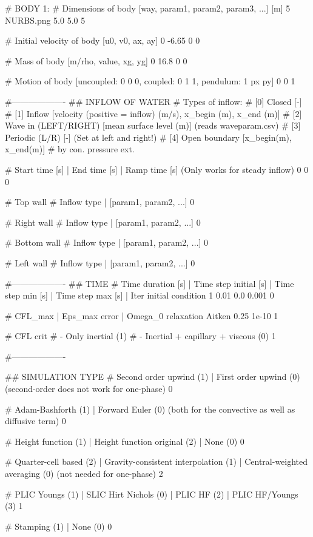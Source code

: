 # BODY 1:
# Dimensions of body [way, param1, param2, param3, ...] [m]
5 NURBS.png 5.0 5.0 5

# Initial velocity of body [u0, v0, ax, ay]
0 -6.65 0 0

# Mass of body [m/rho, value, xg, yg]
0 16.8 0 0

# Motion of body [uncoupled: 0 0 0, coupled: 0 1 1, pendulum: 1 px py]
0 0 1

#-------------------
## INFLOW OF WATER
# Types of inflow:
# [0] Closed                [-]
# [1] Inflow                [velocity (positive = inflow) (m/s), x_begin (m), x_end (m)]
# [2] Wave in (LEFT/RIGHT)  [mean surface level (m)] (reads waveparam.csv)
# [3] Periodic (L/R)        [-] (Set at left and right!)
# [4] Open boundary         [x_begin(m), x_end(m)]
#     by con. pressure ext.

# Start time [s] | End time [s] | Ramp time [s] (Only works for steady inflow)
0 0 0

# Top wall
# Inflow type | [param1, param2, ...]
0

# Right wall
# Inflow type | [param1, param2, ...]
0

# Bottom wall
# Inflow type | [param1, param2, ...]
0

# Left wall
# Inflow type | [param1, param2, ...]
0

#-------------------
## TIME
# Time duration [s]	| Time step initial [s]		| Time step min [s]	| Time step max [s] | Iter initial condition
1 0.01 0.0 0.001 0

# CFL_max | Eps_max error | Omega_0 relaxation Aitken
0.25		1e-10	        1

# CFL crit
# - Only inertial (1)
# - Inertial + capillary + viscous (0)
1

#-------------------

## SIMULATION TYPE
# Second order upwind (1)	| First order upwind (0) (second-order does not work for one-phase)
0

# Adam-Bashforth (1)	| Forward Euler (0) (both for the convective as well as diffusive term)
0

# Height function (1)	| Height function original (2) | None (0)
0

# Quarter-cell based (2) | Gravity-consistent interpolation (1)	|	Central-weighted averaging (0) (not needed for one-phase)
2

# PLIC Youngs (1)	| SLIC Hirt Nichols (0) | PLIC HF (2) | PLIC HF/Youngs (3)
1

# Stamping (1)	| None (0)
0

